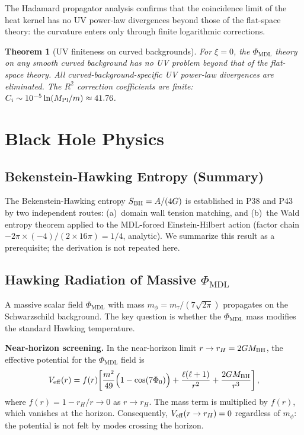 \documentclass[11pt]{article}
\newtheorem{theorem}{Theorem}[section]
\theoremstyle{remark}
\newcommand{\PHIMDL}{\Phi_{\mathrm{MDL}}}
\newcommand{\MPl}{M_{\rm Pl}}
\begin{document}
The Hadamard propagator analysis confirms that the coincidence limit of the heat kernel
has no UV power-law divergences beyond those of the flat-space theory: the curvature
enters only through finite logarithmic corrections.

\begin{theorem}[UV finiteness on curved backgrounds]
\label{thm:uv}
For $\xi=0$, the $\PHIMDL$ theory on any smooth curved background has no
UV problem beyond that of the flat-space theory.  All curved-background-specific UV
power-law divergences are eliminated.  The $R^2$ correction coefficients are finite:
$C_i\sim 10^{-5}\ln(\MPl/m) \approx 41.76$.
\end{theorem}

\section{Black Hole Physics}
\label{sec:bh}

\subsection{Bekenstein-Hawking Entropy (Summary)}
\label{sec:bhe}

The Bekenstein-Hawking entropy $S_{\rm BH} = A/(4G)$ is established in P38 and P43
by two independent routes: (a)~domain wall tension matching, and (b)~the Wald entropy
theorem applied to the MDL-forced Einstein-Hilbert action (factor chain $-2\pi\times(-4)/(2\times16\pi)=1/4$, analytic). We summarize this result as a prerequisite; the derivation is not repeated here.

\subsection{Hawking Radiation of Massive $\PHIMDL$}
\label{sec:hawking}

A massive scalar field $\PHIMDL$ with mass $m_\phi = m_\tau/(7\sqrt{2\pi})$ propagates
on the Schwarzschild background.  The key question is whether the $\PHIMDL$ mass modifies
the standard Hawking temperature.

\smallskip\noindent\textbf{Near-horizon screening.}  In the near-horizon limit
$r\to r_H = 2GM_{\rm BH}$, the effective potential for the $\PHIMDL$ field is
\begin{equation}
  V_{\rm eff}(r) = f(r)\!\left[\frac{m^2}{49}\Bigl(1-\cos(7\Phi_0)\Bigr)
    + \frac{\ell(\ell+1)}{r^2} + \frac{2GM_{\rm BH}}{r^3}\right],
\end{equation}
where $f(r)=1-r_H/r\to 0$ as $r\to r_H$.  The mass term is multiplied by $f(r)$, which
vanishes at the horizon.  Consequently, $V_{\rm eff}(r\to r_H) = 0$ regardless of
$m_\phi$: the potential is not felt by modes crossing the horizon.
\end{document}

